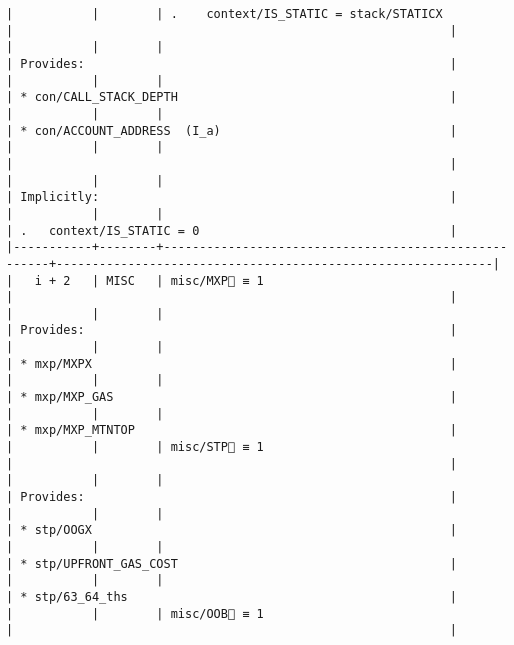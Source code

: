 \documentclass[varwidth=\maxdimen,margin=0.5cm,multi={verbatim}]{standalone}
\begin{document}
\begin{verbatim}
|           |        | .    context/IS_STATIC = stack/STATICX               |                                                             |
|           |        |                                                      | Provides:                                                   |
|           |        |                                                      | * con/CALL_STACK_DEPTH                                      |
|           |        |                                                      | * con/ACCOUNT_ADDRESS  (I_a)                                |
|           |        |                                                      |                                                             |
|           |        |                                                      | Implicitly:                                                 |
|           |        |                                                      | .   context/IS_STATIC = 0                                   |
|-----------+--------+------------------------------------------------------+-------------------------------------------------------------|
|   i + 2   | MISC   | misc/MXP🚩 ≡ 1                                       |                                                             |
|           |        |                                                      | Provides:                                                   |
|           |        |                                                      | * mxp/MXPX                                                  |
|           |        |                                                      | * mxp/MXP_GAS                                               |
|           |        |                                                      | * mxp/MXP_MTNTOP                                            |
|           |        | misc/STP🚩 ≡ 1                                       |                                                             |
|           |        |                                                      | Provides:                                                   |
|           |        |                                                      | * stp/OOGX                                                  |
|           |        |                                                      | * stp/UPFRONT_GAS_COST                                      |
|           |        |                                                      | * stp/63_64_ths                                             |
|           |        | misc/OOB🚩 ≡ 1                                       |                                                             |

\end{verbatim}
\end{document}
